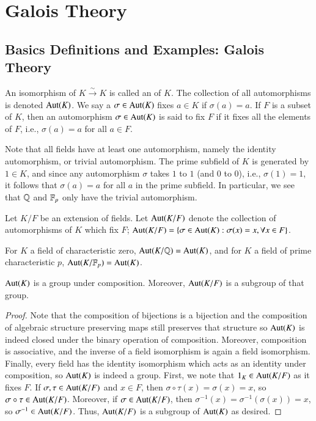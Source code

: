 \chapter{\textsection\textsection Galois Theory}


\section{\textsection Basics Definitions and Examples: Galois Theory}


\begin{defn}
    An isomorphism of $K\xrightarrow{\sim} K$ is called an  of $K$. The collection of all automorphisms is denoted $\operatorname{Aut}(K)$. We say a $\sigma \in \operatorname{Aut}(K)$ fixes $a \in K$ if $\sigma(a) = a$. If $F$ is a subset of $K$, then an automorphism $\sigma \in \operatorname{Aut}(K)$ is said to fix $F$ if it fixes all the elements of $F$, i.e., $\sigma(a) =a$ for all $a \in F$.
\end{defn}

Note that all fields have at least one automorphism, namely the identity automorphism, or trivial automorphism. The prime subfield of $K$ is generated by $1 \in K$, and since any automorphism $\sigma$ takes $1$ to $1$ (and $0$ to $0$), i.e., $\sigma(1) = 1$, it follows that $\sigma(a) = a$ for all $a$ in the prime subfield. In particular, we see that $\mathbb Q$ and $\mathbb F_p$ only have the trivial automorphism.

\begin{defn}
    Let $K/F$ be an extension of fields. Let $\operatorname{Aut}(K/F)$ denote the collection of automorphisms of $K$ which fix $F$; $\operatorname{Aut}(K/F) = \{\sigma \in \operatorname{Aut}(K):\sigma(x) = x,\forall x \in F\}$.
\end{defn}

\begin{eg}
    For $K$ a field of characteristic zero, $\operatorname{Aut}(K/\mathbb Q) = \operatorname{Aut}(K)$, and for $K$ a field of prime characteristic $p$, $\operatorname{Aut}(K/\mathbb F_p) = \operatorname{Aut}(K)$.
\end{eg}

\begin{prop}
    $\operatorname{Aut}(K)$ is a group under composition. Moreover, $\operatorname{Aut}(K/F)$ is a subgroup of that group.
\end{prop}
\begin{proof}
    Note that the composition of bijections is a bijection and the composition of algebraic structure preserving maps still preserves that structure so $\operatorname{Aut}(K)$ is indeed closed under the binary operation of composition. Moreover, composition is associative, and the inverse of a field isomorphism is again a field isomorphism. Finally, every field has the identity isomorphism which acts as an identity under composition, so $\operatorname{Aut}(K)$ is indeed a group. First, we note that $1_K \in \operatorname{Aut}(K/F)$ as it fixes $F$. If $\sigma, \tau \in \operatorname{Aut}(K/F)$ and $x \in F$, then $\sigma\circ \tau(x) = \sigma(x) = x$, so $\sigma \circ \tau \in \operatorname{Aut}(K/F)$. Moreover, if $\sigma \in \operatorname{Aut}(K/F)$, then $\sigma^{-1}(x) = \sigma^{-1}(\sigma(x)) = x$, so $\sigma^{-1} \in \operatorname{Aut}(K/F)$. Thus, $\operatorname{Aut}(K/F)$ is a subgroup of $\operatorname{Aut}(K)$ as desired.
\end{proof}



